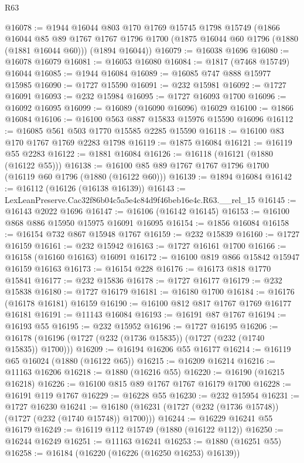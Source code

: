 \begin{lexlean}{R63}
\begin{coremodule}
@16078 := @1944
    @16044
    @803
    @170
    @1769
    @15745
    @1798
    @15749
    (@1866
      @16044
      @85
      @89
      @1767
      @1767
      @1796
      @1700
      (@1875 @16044 @60 @1796 (@1880 (@1881 @16044 @60)))
      (@1894 @16044))
@16079 := @16038 @1696
@16080 := @16078 @16079
@16081 := @16053 @16080
@16084 := @1817 (@7468 @15749) @16044
@16085 := @1944 @16084
@16089 := @16085 @747 @888 @15977 @15985
@16090 := @1727 @15590
@16091 := @232 @15981
@16092 := @1727 @16091
@16093 := @232 @15984
@16095 := @1727 @16093 @1700
@16096 := @16092 @16095
@16099 := @16089 (@16090 @16096) @16029
@16100 := @1866 @16084
@16106 := @16100 @563 @887 @15833 @15976 @15590 @16096
@16112 := @16085 @561 @503 @1770 @15585 @2285 @15590
@16118 := @16100 @83 @170 @1767 @1769 @2283 @1798
@16119 := @1875 @16084
@16121 := @16119 @55 @2283
@16122 := @1881 @16084
@16126 := @16118 (@16121 (@1880 (@16122 @55)))
@16138 := @16100 @85 @89 @1767 @1767 @1796 @1700 (@16119 @60 @1796 (@1880 (@16122 @60)))
@16139 := @1894 @16084
@16142 := @16112 (@16126 (@16138 @16139))
@16143 := LexLeanPreserve.Cac32f86b04c5a5e4c84d9f46beb16e4c.R63.__rel_15
@16145 := @16143 @2022 @1696
@16147 := @16106 (@16142 @16145)
@16153 := @16100 @868 @886 @15950 @15975 @16091 @16095
@16154 := @1856 @16084
@16158 := @16154 @732 @867 @15948 @1767
@16159 := @232 @15839
@16160 := @1727 @16159
@16161 := @232 @15942
@16163 := @1727 @16161 @1700
@16166 := @16158 (@16160 @16163) @16091
@16172 := @16100 @819 @866 @15842 @15947 @16159 @16163
@16173 := @16154 @228
@16176 := @16173 @818 @1770 @15841
@16177 := @232 @15836
@16178 := @1727 @16177
@16179 := @232 @15838
@16180 := @1727 @16179
@16181 := @16180 @1700
@16184 := @16176 (@16178 @16181) @16159
@16190 := @16100 @812 @817 @1767 @1769 @16177 @16181
@16191 := @11143 @16084
@16193 := @16191 @87 @1767
@16194 := @16193 @55
@16195 := @232 @15952
@16196 := @1727 @16195
@16206 := @16178 (@16196 (@1727 (@232 (@1736 @15835)) (@1727 (@232 (@1740 @15835)) @1700)))
@16209 := @16194 @16206 @55 @16177
@16214 := @16119 @65 @16024 (@1880 (@16122 @65))
@16215 := @16209 @16214
@16216 := @11163 @16206
@16218 := @1880 (@16216 @55)
@16220 := @16190 (@16215 @16218)
@16226 := @16100 @815 @89 @1767 @1767 @16179 @1700
@16228 := @16191 @119 @1767
@16229 := @16228 @55
@16230 := @232 @15954
@16231 := @1727 @16230
@16241 := @16180 (@16231 (@1727 (@232 (@1736 @15748)) (@1727 (@232 (@1740 @15748)) @1700)))
@16244 := @16229 @16241 @55 @16179
@16249 := @16119 @112 @15749 (@1880 (@16122 @112))
@16250 := @16244 @16249
@16251 := @11163 @16241
@16253 := @1880 (@16251 @55)
@16258 := @16184 (@16220 (@16226 (@16250 @16253) @16139))

\end{coremodule}
\end{lexlean}

